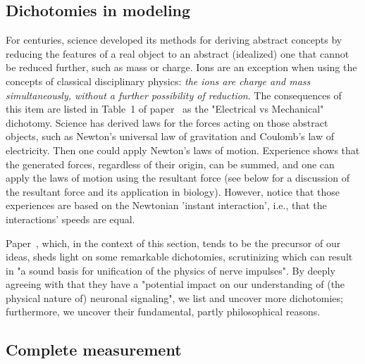 \subsection[Dichotomies]{Dichotomies in modeling\label{sec:Physics-Dichotomies}}

For centuries, science developed its methods for deriving abstract concepts
by reducing the features of a real object to an abstract (idealized) one that cannot be reduced further, such as mass or charge.
Ions are an exception when using the concepts of classical disciplinary physics: \textit{the ions are charge and mass simultaneously, without a further possibility of reduction}.
The consequences of this item are listed in Table~1 of paper~\cite{ThermodynamicAPDrukarch:2022}
as the "Electrical vs Mechanical" \hypertarget{dichotomy}{dichotomy}.
Science has derived laws for the forces acting on those abstract objects, such as Newton's universal law of gravitation and Coulomb's law of electricity. Then one could apply Newton's laws of motion. Experience shows that the generated forces, regardless of their origin, can be summed, and one can apply the laws of motion using the resultant force (see below for a discussion of the resultant force and its application in biology). However, notice that those experiences are based on the Newtonian
'instant interaction', i.e., that the interactions' speeds are equal.




Paper~\cite{ThermodynamicAPDrukarch:2022}, which, in the context of this section, tends to be the precursor of our ideas, sheds light on some remarkable dichotomies,
scrutinizing which can result in "a sound basis for unification of the physics of nerve impulses".
By deeply agreeing with that they have a "potential impact on our understanding of (the physical nature of) neuronal signaling", we list and uncover more dichotomies; furthermore, we uncover their fundamental,
partly philosophical reasons.





\subsection{Complete measurement\label{sec:Physics-Complete}}

